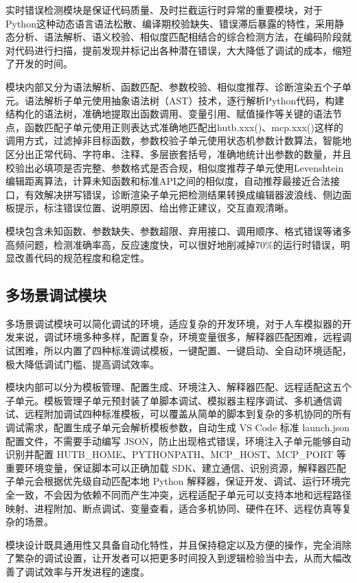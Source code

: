 实时错误检测模块是保证代码质量、及时拦截运行时异常的重要模块，对于Python这种动态语言语法松散、编译期校验缺失、错误滞后暴露的特性，采用静态分析、语法解析、语义校验、相似度匹配相结合的综合检测方法，在编码阶段就对代码进行扫描，提前发现并标记出各种潜在错误，大大降低了调试的成本，缩短了开发的时间。

模块内部又分为语法解析、函数匹配、参数校验、相似度推荐、诊断渲染五个子单元。语法解析子单元使用抽象语法树（AST）技术，逐行解析Python代码，构建结构化的语法树，准确地提取出函数调用、变量引用、赋值操作等关键的语法节点，函数匹配子单元使用正则表达式准确地匹配出hutb.xxx()、mcp.xxx()这样的调用方式，过滤掉非目标函数，参数校验子单元使用状态机参数计数算法，智能地区分出正常代码、字符串、注释、多层嵌套括号，准确地统计出参数的数量，并且校验出必填项是否完整、参数格式是否合规，相似度推荐子单元使用Levenshtein编辑距离算法，计算未知函数和标准API之间的相似度，自动推荐最接近合法接口，有效解决拼写错误，诊断渲染子单元把检测结果转换成编辑器波浪线、侧边面板提示，标注错误位置、说明原因、给出修正建议，交互直观清晰。

模块包含未知函数、参数缺失、参数超限、弃用接口、调用顺序、格式错误等诸多高频问题，检测准确率高，反应速度快，可以很好地削减掉70\%的运行时错误，明显改善代码的规范程度和稳定性。

\subsection{多场景调试模块}

多场景调试模块可以简化调试的环境，适应复杂的开发环境，对于人车模拟器的开发来说，调试环境多种多样，配置复杂，环境变量很多，解释器匹配困难，远程调试困难，所以内置了四种标准调试模板，一键配置、一键启动、全自动环境适配，极大降低调试门槛、提高调试效率。

模块内部可以分为模板管理、配置生成、环境注入、解释器匹配、远程适配这五个子单元。模板管理子单元预封装了单脚本调试、模拟器主程序调试、多机通信调试、远程附加调试四种标准模板，可以覆盖从简单的脚本到复杂的多机协同的所有调试需求，配置生成子单元会解析模板参数，自动生成
VS Code 标准 launch.json 配置文件，不需要手动编写
JSON，防止出现格式错误，环境注入子单元能够自动识别并配置
HUTB\_HOME、PYTHONPATH、MCP\_HOST、MCP\_PORT
等重要环境变量，保证脚本可以正确加载
SDK、建立通信、识别资源，解释器匹配子单元会根据优先级自动匹配本地 Python
解释器，保证开发、调试、运行环境完全一致，不会因为依赖不同而产生冲突，远程适配子单元可以支持本地和远程路径映射、进程附加、断点调试、变量查看，适合多机协同、硬件在环、远程仿真等复杂的场景。

模块设计既具通用性又具备自动化特性，并且保持稳定以及方便的操作，完全消除了繁杂的调试设置，让开发者可以把更多时间投入到逻辑检验当中去，从而大幅改善了调试效率与开发进程的速度。


